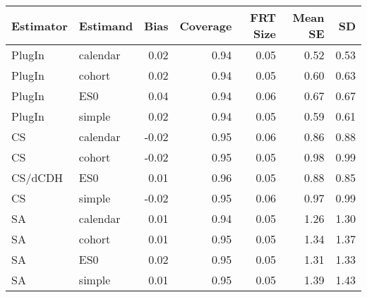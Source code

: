 \captionsetup[table]{labelformat=empty,skip=1pt}
\begin{longtable}{llrrrrr}
\toprule
Estimator & Estimand & Bias & Coverage & FRT Size & Mean SE & SD \\ 
\midrule
PlugIn & calendar & 0.02 & 0.94 & 0.05 & 0.52 & 0.53 \\ 
PlugIn & cohort & 0.02 & 0.94 & 0.05 & 0.60 & 0.63 \\ 
PlugIn & ES0 & 0.04 & 0.94 & 0.06 & 0.67 & 0.67 \\ 
PlugIn & simple & 0.02 & 0.94 & 0.05 & 0.59 & 0.61 \\ 
CS & calendar & -0.02 & 0.95 & 0.06 & 0.86 & 0.88 \\ 
CS & cohort & -0.02 & 0.95 & 0.05 & 0.98 & 0.99 \\ 
CS/dCDH & ES0 & 0.01 & 0.96 & 0.05 & 0.88 & 0.85 \\ 
CS & simple & -0.02 & 0.95 & 0.06 & 0.97 & 0.99 \\ 
SA & calendar & 0.01 & 0.94 & 0.05 & 1.26 & 1.30 \\ 
SA & cohort & 0.01 & 0.95 & 0.05 & 1.34 & 1.37 \\ 
SA & ES0 & 0.02 & 0.95 & 0.05 & 1.31 & 1.33 \\ 
SA & simple & 0.01 & 0.95 & 0.05 & 1.39 & 1.43 \\ 
 \bottomrule
\end{longtable}

